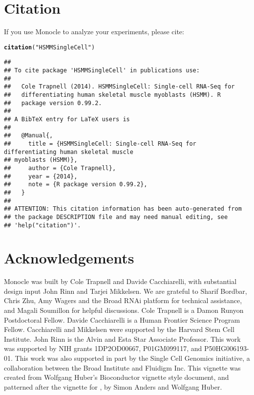 \documentclass[10pt,oneside]{article}\usepackage[]{graphicx}\usepackage[]{color}
\makeatletter
\newcommand{\hlstr}[1]{\textcolor[rgb]{0.192,0.494,0.8}{#1}}%
\newcommand{\hlstd}[1]{\textcolor[rgb]{0.345,0.345,0.345}{#1}}%
\newcommand{\hlkwd}[1]{\textcolor[rgb]{0.737,0.353,0.396}{\textbf{#1}}}%
\newenvironment{kframe}{%
 \def\at@end@of@kframe{}%
 \ifinner\ifhmode%
  \def\at@end@of@kframe{\end{minipage}}%
  \begin{minipage}{\columnwidth}%
 \fi\fi%
 \def\FrameCommand##1{\hskip\@totalleftmargin \hskip-\fboxsep
 \colorbox{shadecolor}{##1}\hskip-\fboxsep
     \hskip-\linewidth \hskip-\@totalleftmargin \hskip\columnwidth}%
 \MakeFramed {\advance\hsize-\width
   \@totalleftmargin\z@ \linewidth\hsize
   \@setminipage}}%
 {\par\unskip\endMakeFramed%
 \at@end@of@kframe}
\newenvironment{knitrout}{}{} %
\makeatother
\begin{document}
\section{Citation}
If you use Monocle to analyze your experiments, please cite:
\begin{knitrout}
\color{fgcolor}\begin{kframe}
\begin{alltt}
\hlkwd{citation}\hlstd{(}\hlstr{"HSMMSingleCell"}\hlstd{)}
\end{alltt}
\begin{verbatim}
## 
## To cite package 'HSMMSingleCell' in publications use:
## 
##   Cole Trapnell (2014). HSMMSingleCell: Single-cell RNA-Seq for
##   differentiating human skeletal muscle myoblasts (HSMM). R
##   package version 0.99.2.
## 
## A BibTeX entry for LaTeX users is
## 
##   @Manual{,
##     title = {HSMMSingleCell: Single-cell RNA-Seq for differentiating human skeletal muscle
## myoblasts (HSMM)},
##     author = {Cole Trapnell},
##     year = {2014},
##     note = {R package version 0.99.2},
##   }
## 
## ATTENTION: This citation information has been auto-generated from
## the package DESCRIPTION file and may need manual editing, see
## 'help("citation")'.
\end{verbatim}
\end{kframe}
\end{knitrout}


\section{Acknowledgements}

Monocle was built by Cole Trapnell and Davide Cacchiarelli, with substantial design input John Rinn and Tarjei Mikkelsen. We are grateful to Sharif Bordbar, Chris Zhu, Amy Wagers and the Broad RNAi platform for technical assistance, and Magali Soumillon for helpful discussions. Cole Trapnell is a Damon Runyon Postdoctoral Fellow. Davide Cacchiarelli is a Human Frontier Science Program Fellow. Cacchiarelli and Mikkelsen were supported by the Harvard Stem Cell Institute. John Rinn is the Alvin and Esta Star Associate Professor. This work was supported by NIH grants 1DP2OD00667, P01GM099117, and P50HG006193-01. This work was also supported in part by the Single Cell Genomics initiative, a collaboration between the Broad Institute and Fluidigm Inc. This vignette was created from Wolfgang Huber's Bioconductor vignette style document, and patterned after the vignette for , by Simon Anders and Wolfgang Huber.
\end{document}
